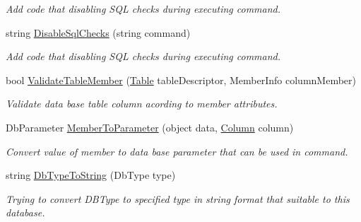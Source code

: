 \begin{DoxyCompactItemize}
\begin{DoxyCompactList}\small\item\em Add code that disabling S\+QL checks during executing command. \end{DoxyCompactList}\item 
string \mbox{\hyperlink{class_uniform_data_operator_1_1_sql_1_1_my_sql_1_1_my_sql_data_operator_a3e80f9136c9fef46a443901a15f1e289}{Disable\+Sql\+Checks}} (string command)
\begin{DoxyCompactList}\small\item\em Add code that disabling S\+QL checks during executing command. \end{DoxyCompactList}\item 
bool \mbox{\hyperlink{class_uniform_data_operator_1_1_sql_1_1_my_sql_1_1_my_sql_data_operator_a233ab791c68b93aded97bfd9986767e8}{Validate\+Table\+Member}} (\mbox{\hyperlink{class_uniform_data_operator_1_1_sql_1_1_tables_1_1_attributes_1_1_table}{Table}} table\+Descriptor, Member\+Info column\+Member)
\begin{DoxyCompactList}\small\item\em Validate data base table column acording to member attributes. \end{DoxyCompactList}\item 
Db\+Parameter \mbox{\hyperlink{class_uniform_data_operator_1_1_sql_1_1_my_sql_1_1_my_sql_data_operator_a7d10fc1dfc16ece78ad066f596523782}{Member\+To\+Parameter}} (object data, \mbox{\hyperlink{class_uniform_data_operator_1_1_sql_1_1_tables_1_1_attributes_1_1_column}{Column}} column)
\begin{DoxyCompactList}\small\item\em Convert value of member to data base parameter that can be used in command. \end{DoxyCompactList}\item 
string \mbox{\hyperlink{class_uniform_data_operator_1_1_sql_1_1_my_sql_1_1_my_sql_data_operator_a7b854ebbcdf31c67716d8c365c321a31}{Db\+Type\+To\+String}} (Db\+Type type)
\begin{DoxyCompactList}\small\item\em Trying to convert D\+B\+Type to specified type in string format that suitable to this database. \end{DoxyCompactList}\end{DoxyCompactItemize}
